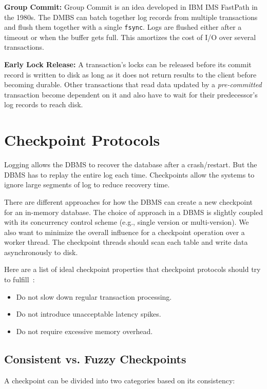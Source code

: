 \documentclass[11pt]{article}
\begin{document}
\textbf{Group Commit:} Group Commit is an idea developed in IBM IMS FastPath in the 1980s. The DMBS can batch together log records from multiple transactions and flush them together with a single \texttt{fsync}. Logs are flushed either after a timeout or when the buffer gets full. This amortizes the cost of I/O over several transactions.

\textbf{Early Lock Release:} A transaction's locks can be released before its commit record is written to disk as long as it does not return results to the client before becoming durable. Other transactions that read data updated by a \textit{pre-committed} transaction become dependent on it and also have to wait for their predecessor's log records to reach disk.

\section{Checkpoint Protocols}
Logging allows the DBMS to recover the database after a crash/restart. But the DBMS has to replay the entire log each time. Checkpoints allow the systems to ignore large segments of log to reduce recovery time.

There are different approaches for how the DBMS can create a new checkpoint for an in-memory database. The choice of approach in a DBMS is slightly coupled with its concurrency control scheme (e.g., single version or multi-version). We also want to minimize the overall influence for a checkpoint operation over a worker thread. The checkpoint threads should scan each table and write data asynchronously to disk.

Here are a list of ideal checkpoint properties that checkpoint protocols should try to fulfill~\cite{5507562}:
\begin{itemize}
    \item Do not slow down regular transaction processing.
    \item Do not introduce unacceptable latency spikes.
    \item Do not require excessive memory overhead.
\end{itemize}

\subsection*{Consistent vs. Fuzzy Checkpoints}
A checkpoint can be divided into two categories based on its consistency:
\end{document}
